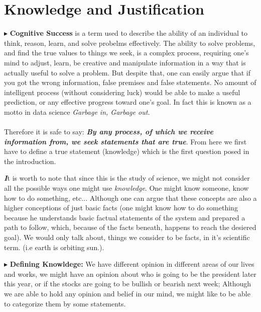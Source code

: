 \documentclass[9pt,a4paper,twocolumn]{article}
\newcounter{def}
\newenvironment{callout}
	{\begin{calloutbox}\color{charcoal}\textbf\textit}
	{\end{calloutbox}}
\newcommand{\newpoint}[1]{\indent$\blacktriangleright$ \textbf{#1}}
\begin{document}
        \section{Knowledge and Justification}
            \newpoint{Cognitive Success} is a term used to describe the ability of an individual to think, reason, learn, and solve probelms effectively. The ability to solve problems, and find the true values to things we seek, is a complex process, requiring one's mind to adjust, learn, be creative and manipulate information in a way that is actually useful to solve a problem. But despite that, one can easily argue that if you got the wrong information, false premises and false statements. No amount of intelligent process (without considering luck) would be able to make a useful prediction, or any effective progress toward one's goal. In fact this is known as a motto in data science \textit{Garbage in, Garbage out.}\cite{sep-epistemology}\cite{Clegg2017-ev}
            \\
            \\
            Therefore it is safe to say: \textbf{\textit{By any process, of which we receive information from, we seek statements that are true}}. From here we first have to define a true statement (knowledge) which is the first question posed in the introduction.
            \begin{callout}
                It is worth to note that since this is the study of science, we might not consider all the possible ways one might use \textit{knowledge}. One might know someone, know how to do something, etc... Although one can argue that these concepts are also a higher conceptions of just basic facts (one might know how to do something because he understands basic factual statements of the system and prepared a path to follow, which, because of the facts beneath, happens to reach the desiered goal). We would only talk about, things we consider to be facts, in it's scientific term. (i.e earth is orbiting sun.).
            \end{callout}
                \newpoint{Defining Knowldege:} We have different opinion in different areas of our lives and works, we might have an opinion about who is going to be the president later this year, or if the stocks are going to be bullish or bearish next week; Although we are able to hold any opinion and belief in our mind, we might like to be able to categorize them by some statements.\cite{CW/E}\cite{sep-epistemology}
                \\
                \\
\end{document}
